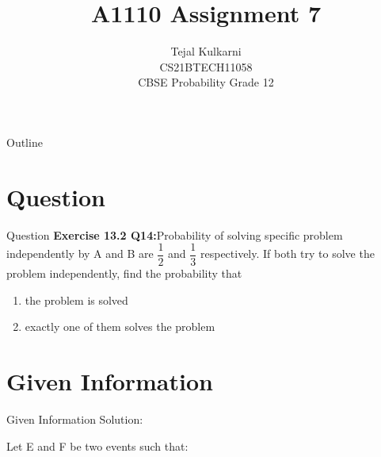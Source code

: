 \documentclass{beamer}
\title{A1110 Assignment 7 }
\author{Tejal Kulkarni \\ CS21BTECH11058 \\\vspace*{20pt} CBSE Probability Grade 12 }
\begin{document}
\providecommand{\pr}[1]{\ensuremath{\Pr\left(#1\right)}}
\providecommand{\qfunc}[1]{\ensuremath{Q\left(#1\right)}}
\providecommand{\sbrak}[1]{\ensuremath{{}\left[#1\right]}}
\providecommand{\lsbrak}[1]{\ensuremath{{}\left[#1\right.}}
\providecommand{\rsbrak}[1]{\ensuremath{{}\left.#1\right]}}
\providecommand{\brak}[1]{\ensuremath{\left(#1\right)}}
\providecommand{\lbrak}[1]{\ensuremath{\left(#1\right.}}
\providecommand{\rbrak}[1]{\ensuremath{\left.#1\right)}}
\providecommand{\cbrak}[1]{\ensuremath{\left\{#1\right\}}}
\providecommand{\lcbrak}[1]{\ensuremath{\left\{#1\right.}}
\providecommand{\rcbrak}[1]{\ensuremath{\left.#1\right\}}}
\newcommand*{\permcomb}[4][0mu]{{{}^{#3}\mkern#1#2_{#4}}}
\newcommand*{\perm}[1][-3mu]{\permcomb[#1]{P}}
\newcommand*{\comb}[1][-1mu]{\permcomb[#1]{C}}
\renewcommand{\thetable}{\arabic{table}} 


\begin{frame}
    \titlepage
\end{frame}

\begin{frame}{Outline}
  \tableofcontents
\end{frame}

\section{Question}

\begin{frame}{Question}
\textbf{Exercise 13.2 Q14:}Probability of solving specific problem independently by A and B are $\dfrac{1}{2}$ and $\dfrac{1}{3}$ respectively. If both try to solve the problem independently, find the probability that 
\begin{enumerate} [label = (\roman*)]
    \item the problem is solved
    \item exactly one of them solves the problem
\end{enumerate}
\end{frame}

\section{Given Information}

\begin{frame}{Given Information}
Solution: 
 
 Let  E and F be two events such that:
\begin{table}[ht!]
    \centering
    
    \caption{}
    \label{Table1}
\end{table}
\end{frame} 
\end{document}
